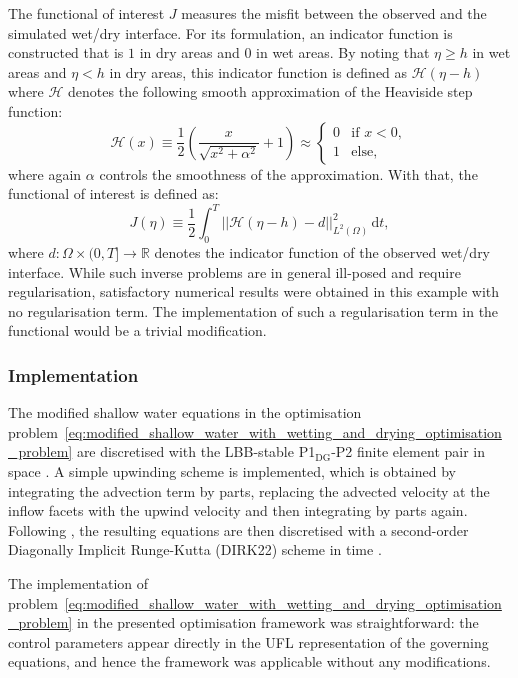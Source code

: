 \documentclass[prodmode,acmtoms]{acmsmall}
\newcommand{\ponedgptwo}{\mbox{P1$_\textrm{DG}$-P2}\xspace}
\newcommand{\dt}{\,\mathrm{d}t}
\begin{document}
The functional of interest $J$ measures the misfit between the observed and the simulated wet/dry interface.
For its formulation, an indicator function is constructed that is $1$ in dry areas and $0$ in wet areas. 
By noting that $\eta \ge h$ in wet areas and $\eta < h$ in dry areas, this indicator function is defined as $\mathcal{H}(\eta - h)$  where 
$\mathcal{H}$ denotes the following smooth approximation of the Heaviside step function:
\begin{equation*}
  \mathcal{H}(x) \equiv \frac{1}{2}\left( \frac{x}{\sqrt{x^2 + \alpha^2}} + 1 \right)\approx
\begin{cases} 
0 & \mbox{if } x < 0, \\ 
1 & \mbox{else},
\end{cases} \label{eq:wd_opt_smooth_heaviside_approx} 
\end{equation*}
where again $\alpha$ controls the smoothness of the approximation.
With that, the functional of interest is defined as:
\begin{equation*}
J(\eta) \equiv \frac{1}{2} \int_0^T \left|\left| \mathcal{H}(\eta - h) - d \right|\right|^2_{L^2(\Omega)} \dt, \label{eq:opt_wd_functional}
\end{equation*}
where $d : \Omega \times (0, T] \to \mathbb R$ denotes the indicator function of the observed wet/dry interface.
While such inverse problems are in general ill-posed and require regularisation, satisfactory numerical results were obtained in this example with no
regularisation term. The implementation of such a regularisation term in the functional would be a trivial modification. 

\subsubsection{Implementation}
The modified shallow water equations in the optimisation problem~\eqref{eq:modified_shallow_water_with_wetting_and_drying_optimisation_problem} are discretised 
with the LBB-stable \ponedgptwo finite element pair in space \cite{cotter2008b}.
A simple upwinding scheme is implemented, which is
obtained by integrating the advection term by parts, replacing the advected
velocity at the inflow facets with the upwind velocity and then integrating
by parts again.
Following , the resulting equations are then discretised with a second-order Diagonally Implicit Runge-Kutta (DIRK22) scheme in time \cite[\S 2.6]{ascher1997}.

The implementation of problem~\eqref{eq:modified_shallow_water_with_wetting_and_drying_optimisation_problem} 
in the presented optimisation framework was straightforward: 
the control parameters appear directly in the UFL representation of the governing equations,
and hence the framework was applicable without any modifications.
\end{document}
